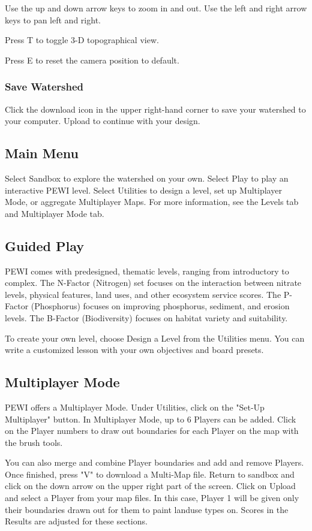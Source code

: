 \documentclass[11pt]{article}
\begin{document}
\begin{itemize}
Use the up and down arrow keys to zoom in and out.
Use the left and right arrow keys to pan left and right.

Press T to toggle 3-D topographical view.

Press E to reset the camera position to default.

\subsubsection{Save Watershed}
Click the download icon in the upper right-hand corner to save your watershed to your computer. Upload to continue with your design.

\subsection{Main Menu}
Select Sandbox to explore the watershed on your own.
Select Play to play an interactive PEWI level.
Select Utilities to design a level, set up Multiplayer Mode, or aggregate Multiplayer Maps.
For more information, see the Levels tab and Multiplayer Mode tab.

\subsection{Guided Play}
PEWI comes with predesigned, thematic levels, ranging from introductory to complex. The N-Factor (Nitrogen) set focuses on the interaction between nitrate levels, physical features, land uses, and other ecosystem service scores. The P-Factor (Phosphorus) focuses on improving phosphorus, sediment, and erosion levels. The B-Factor (Biodiversity) focuses on habitat variety and suitability.

To create your own level, choose Design a Level from the Utilities menu. You can write a customized lesson with your own objectives and board presets.

\subsection{Multiplayer Mode}
PEWI offers a Multiplayer Mode. Under Utilities, click on the "Set-Up Multiplayer" button. In Multiplayer Mode, up to 6 Players can be added. Click on the Player numbers to draw out boundaries for each Player on the map with the brush tools.

You can also merge and combine Player boundaries and add and remove Players. Once finished, press "V" to download a Multi-Map file. Return to sandbox and click on the down arrow on the upper right part of the screen. Click on Upload and select a Player from your map files. In this case, Player 1 will be given only their boundaries drawn out for them to paint landuse types on. Scores in the Results are adjusted for these sections.


\end{itemize}
\end{document}
